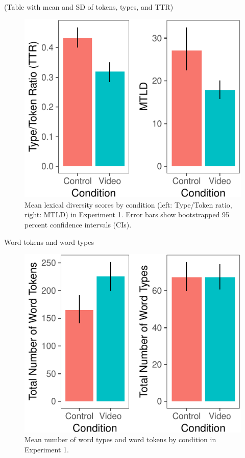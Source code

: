 \documentclass[]{article}
\begin{document}
(Table with mean and SD of tokens, types, and TTR)

\begin{figure}[H]

{\centering \includegraphics{figs/e1lex_div-1} 

}

\caption{Mean lexical diversity scores by condition (left: Type/Token ratio, right: MTLD) in Experiment 1. Error bars show bootstrapped 95 percent confidence intervals (CIs).}\label{fig:e1lex_div}
\end{figure}

Word tokens and word types

\begin{figure}[H]

{\centering \includegraphics{figs/e1token_type-1} 

}

\caption{Mean number of word types and word tokens by condition in Experiment 1.}\label{fig:e1token_type}
\end{figure}
\end{document}
